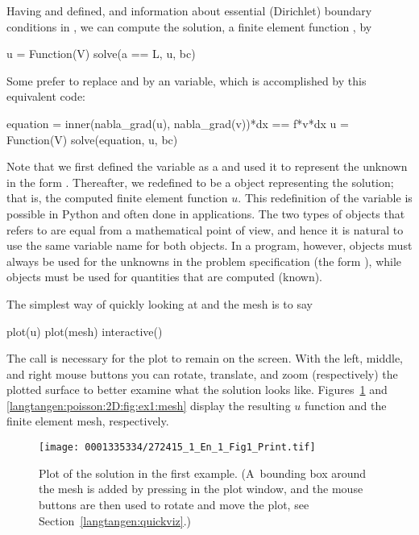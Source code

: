 Having  and  defined, and information about essential
(Dirichlet) boundary conditions in , we can compute the
solution, a finite element function , by
\begin{python}
u = Function(V)
solve(a == L, u, bc)
\end{python}
Some prefer to replace  and  by an 
variable, which is accomplished by this equivalent code:
\begin{python}
equation = inner(nabla_grad(u), nabla_grad(v))*dx == f*v*dx
u = Function(V)
solve(equation, u, bc)
\end{python}


Note that we first defined the variable  as a
 and used it to represent the unknown in the form
.  Thereafter, we redefined  to be a 
object representing the solution; that is, the computed finite element
function $u$.  This redefinition of the variable  is possible
in Python and often done in \fenics{} applications. The two types of
objects that  refers to are equal from a mathematical point of
view, and hence it is natural to use the same variable name for both
objects. In a program, however,  objects must
always be used for the unknowns in the problem specification (the form
), while  objects must be used for quantities
that are computed (known).


The simplest way of quickly looking at  and the mesh is to say
\begin{python}
plot(u)
plot(mesh)
interactive()
\end{python}
The  call is necessary for the plot to remain on the
screen. With the left, middle, and right mouse buttons you can rotate,
translate, and zoom (respectively) the plotted surface to better examine
what the solution looks like.  Figures~\ref{langtangen:poisson:2D:fig:ex1:u}
and \ref{langtangen:poisson:2D:fig:ex1:mesh} display the resulting $u$ function
and the finite element mesh, respectively.

\begin{figure}[!b]
\centering
\texttt{[image: 0001335334/272415\_1\_En\_1\_Fig1\_Print.tif]}
\caption{Plot of the solution in the first \fenics{} example.
(A~bounding box around the mesh is added by pressing  in the plot
window, and the mouse buttons are then used to rotate and move the
plot, see Section~\ref{langtangen:quickviz}.)}
\label{langtangen:poisson:2D:fig:ex1:u}
\end{figure}

